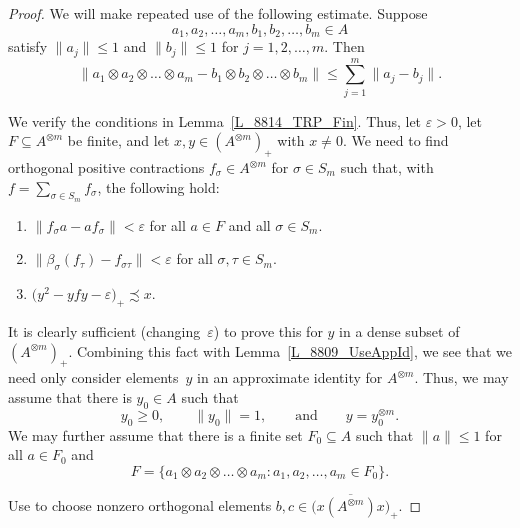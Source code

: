 \documentclass[11pt]{amsart}
\theoremstyle{plain}
\theoremstyle{definition}
\theoremstyle{remark}
\numberwithin{equation}{section}
\newcounter{TmpEnumi}
\newcommand{\bt}{\beta}
\newcommand{\ep}{\varepsilon}
\newcommand{\sm}{\sigma}
\newcommand{\ta}{\tau}
\newcommand{\andeqn}{\qquad {\mbox{and}} \qquad}
\begin{document}
\begin{proof}
We will make repeated use of the following estimate.
Suppose
\[
a_1, a_2, \ldots, a_m, b_1, b_2, \ldots, b_m \in A
\]
satisfy $\| a_j \| \leq 1$ and $\| b_j \| \leq 1$
for $j = 1, 2, \ldots, m$.
Then
%
\begin{equation}\label{Eq_8816_TensEst}
\bigl\| a_1 \otimes a_2 \otimes \dots \otimes a_m
  - b_1 \otimes b_2 \otimes \dots \otimes b_m \bigr\|
 \leq \sum_{j = 1}^m \| a_j - b_j \|.
\end{equation}
%

We verify the conditions in Lemma~\ref{L_8814_TRP_Fin}.
Thus, let $\varepsilon > 0$,
let $F \subseteq A^{\otimes m}$ be finite,
and let $x, y \in (A^{\otimes m})_{+}$ with $x \neq 0$.
We need to find
orthogonal positive contractions
$f_{\sm} \in A^{\otimes m}$ for $\sm \in S_m$ such that,
with $f = \sum_{\sm \in S_m} f_{\sm}$,
the following hold:
%
\begin{enumerate}
%
\item\label{T_8816_PermwTRP_COM}
$\| f_{\sm} a - a f_{\sm} \| < \varepsilon$
for all $a \in F$ and all $\sm \in S_m$.
%
\item\label{T_8816_PermwTRP_LTR}
$\| \bt_{\sm} (f_{\ta}) - f_{\sm \ta} \| < \varepsilon$
for all $\sm, \ta \in S_m$.
%
\item\label{T_8816_PermwTRP_CU_EQ}
$\bigl( y^{2} - y f y - \varepsilon \bigr)_{+} \precsim x$.
\setcounter{TmpEnumi}{\value{enumi}}
\end{enumerate}
%
It is clearly sufficient
(changing~$\ep$)
to prove this for $y$
in a dense subset of $(A^{\otimes m})_{+}$.
Combining this fact with Lemma~\ref{L_8809_UseAppId},
we see that we need only consider elements~$y$
in an approximate identity for $A^{\otimes m}$.
Thus,
we may assume that there is $y_0 \in A$ such that
%
\begin{equation}\label{Eq_8816_y0}
y_0 \geq 0,
\qquad
\| y_0 \| = 1,
\andeqn
y = y_0^{\otimes m}.
\end{equation}
%
We may further assume that there is a finite set $F_0 \subseteq A$
such that $\| a \| \leq 1$ for all $a \in F_0$ and
%
\begin{equation}\label{Eq_8816_DefF0}
F = \bigl\{ a_1 \otimes a_2 \otimes \dots \otimes a_m \colon
 a_1, a_2, \ldots, a_m \in F_0 \bigr\}.
\end{equation}
%

Use \cite[Lemma 2.4]{Ph14}
to choose nonzero orthogonal elements
$b, c \in \bigl( {\overline{x (A^{\otimes m}) x }} \bigr)_{+}$.


\end{proof}
\end{document}

